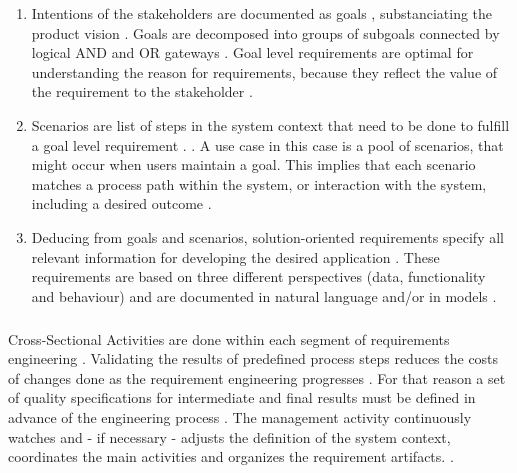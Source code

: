 \begin{enumerate}
    \item Intentions of the stakeholders are documented as goals \parencite[cf.][85]{Pohl.2007}, substanciating the product vision \parencite[cf.][54]{Ebert.2014}. Goals are decomposed into groups of subgoals connected by logical AND and OR gateways \parencite[cf][91]{Pohl.2007}. Goal level requirements are optimal for understanding the reason for requirements, because they reflect the value of the requirement to the stakeholder \parencite[cf.][25]{Lauesen.2008}.
    \item Scenarios are list of steps in the system context that need to be done to fulfill a goal level requirement \parencite[125]{Pohl.2007}.  \parencite[114]{Lauesen.2008}. A use case in this case is a pool of scenarios, that might occur when users maintain a goal. This implies that each scenario matches a process path within the system, or interaction with the system, including a desired outcome \parencite[cf.][114]{Lauesen.2008}.
    \item Deducing from goals and scenarios, solution-oriented requirements specify all relevant information for developing the desired application \parencite[cf.][182-184]{Pohl.2007}. These requirements are based on three different perspectives (data, functionality and behaviour) and are documented in natural language and/or in models \parencite[cf.][184-187]{Pohl.2007}.
\end{enumerate}

\subparagraph{} Cross-Sectional Activities are done within each segment of requirements engineering \parencite[cf.][417, 493]{Pohl.2007}. 
Validating the results of predefined process steps reduces the costs of changes done as the requirement engineering progresses \parencite[cf.][419]{Pohl.2007}. For that reason a set of quality specifications for intermediate and final results must be defined in advance of the engineering process \parencite[cf.][418]{Pohl.2007}.
The management activity continuously watches and - if necessary - adjusts the definition of the system context, coordinates the main activities and organizes the requirement artifacts. \parencite[cf.][493]{Podjarny.2014}.